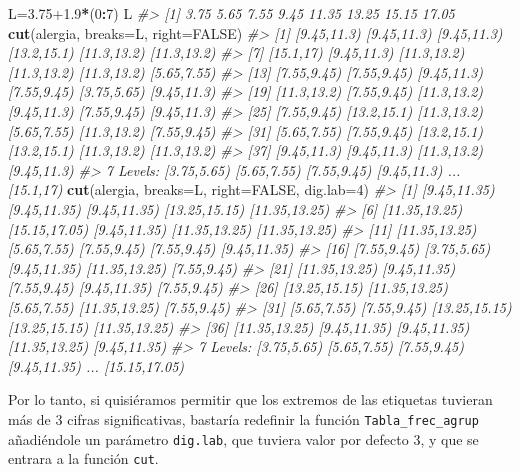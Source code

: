 \documentclass[
]{book}
\newenvironment{Shaded}{\begin{snugshade}}{\end{snugshade}}
\newcommand{\CommentTok}[1]{\textcolor[rgb]{0.56,0.35,0.01}{\textit{#1}}}
\newcommand{\DataTypeTok}[1]{\textcolor[rgb]{0.13,0.29,0.53}{#1}}
\newcommand{\DecValTok}[1]{\textcolor[rgb]{0.00,0.00,0.81}{#1}}
\newcommand{\FloatTok}[1]{\textcolor[rgb]{0.00,0.00,0.81}{#1}}
\newcommand{\KeywordTok}[1]{\textcolor[rgb]{0.13,0.29,0.53}{\textbf{#1}}}
\newcommand{\NormalTok}[1]{#1}
\newcommand{\OperatorTok}[1]{\textcolor[rgb]{0.81,0.36,0.00}{\textbf{#1}}}
\newcommand{\OtherTok}[1]{\textcolor[rgb]{0.56,0.35,0.01}{#1}}
\theoremstyle{definition}
\theoremstyle{definition}
\theoremstyle{definition}
\theoremstyle{remark}
\begin{document}
\begin{Shaded}
\begin{Highlighting}[]
\NormalTok{L=}\FloatTok{3.75+1.9}\OperatorTok{*}\NormalTok{(}\DecValTok{0}\OperatorTok{:}\DecValTok{7}\NormalTok{)}
\NormalTok{L}
\CommentTok{\#\textgreater{} [1]  3.75  5.65  7.55  9.45 11.35 13.25 15.15 17.05}
\KeywordTok{cut}\NormalTok{(alergia, }\DataTypeTok{breaks=}\NormalTok{L, }\DataTypeTok{right=}\OtherTok{FALSE}\NormalTok{)}
\CommentTok{\#\textgreater{}  [1] [9.45,11.3) [9.45,11.3) [9.45,11.3) [13.2,15.1) [11.3,13.2) [11.3,13.2)}
\CommentTok{\#\textgreater{}  [7] [15.1,17)   [9.45,11.3) [11.3,13.2) [11.3,13.2) [11.3,13.2) [5.65,7.55)}
\CommentTok{\#\textgreater{} [13] [7.55,9.45) [7.55,9.45) [9.45,11.3) [7.55,9.45) [3.75,5.65) [9.45,11.3)}
\CommentTok{\#\textgreater{} [19] [11.3,13.2) [7.55,9.45) [11.3,13.2) [9.45,11.3) [7.55,9.45) [9.45,11.3)}
\CommentTok{\#\textgreater{} [25] [7.55,9.45) [13.2,15.1) [11.3,13.2) [5.65,7.55) [11.3,13.2) [7.55,9.45)}
\CommentTok{\#\textgreater{} [31] [5.65,7.55) [7.55,9.45) [13.2,15.1) [13.2,15.1) [11.3,13.2) [11.3,13.2)}
\CommentTok{\#\textgreater{} [37] [9.45,11.3) [9.45,11.3) [11.3,13.2) [9.45,11.3)}
\CommentTok{\#\textgreater{} 7 Levels: [3.75,5.65) [5.65,7.55) [7.55,9.45) [9.45,11.3) ... [15.1,17)}
\KeywordTok{cut}\NormalTok{(alergia, }\DataTypeTok{breaks=}\NormalTok{L, }\DataTypeTok{right=}\OtherTok{FALSE}\NormalTok{, }\DataTypeTok{dig.lab=}\DecValTok{4}\NormalTok{)}
\CommentTok{\#\textgreater{}  [1] [9.45,11.35)  [9.45,11.35)  [9.45,11.35)  [13.25,15.15) [11.35,13.25)}
\CommentTok{\#\textgreater{}  [6] [11.35,13.25) [15.15,17.05) [9.45,11.35)  [11.35,13.25) [11.35,13.25)}
\CommentTok{\#\textgreater{} [11] [11.35,13.25) [5.65,7.55)   [7.55,9.45)   [7.55,9.45)   [9.45,11.35) }
\CommentTok{\#\textgreater{} [16] [7.55,9.45)   [3.75,5.65)   [9.45,11.35)  [11.35,13.25) [7.55,9.45)  }
\CommentTok{\#\textgreater{} [21] [11.35,13.25) [9.45,11.35)  [7.55,9.45)   [9.45,11.35)  [7.55,9.45)  }
\CommentTok{\#\textgreater{} [26] [13.25,15.15) [11.35,13.25) [5.65,7.55)   [11.35,13.25) [7.55,9.45)  }
\CommentTok{\#\textgreater{} [31] [5.65,7.55)   [7.55,9.45)   [13.25,15.15) [13.25,15.15) [11.35,13.25)}
\CommentTok{\#\textgreater{} [36] [11.35,13.25) [9.45,11.35)  [9.45,11.35)  [11.35,13.25) [9.45,11.35) }
\CommentTok{\#\textgreater{} 7 Levels: [3.75,5.65) [5.65,7.55) [7.55,9.45) [9.45,11.35) ... [15.15,17.05)}
\end{Highlighting}
\end{Shaded}

Por lo tanto, si quisiéramos permitir que los extremos de las etiquetas tuvieran más de 3 cifras significativas, bastaría redefinir la función \texttt{Tabla\_frec\_agrup} añadiéndole un parámetro \texttt{dig.lab}, que tuviera valor por defecto 3, y que se entrara a la función \texttt{cut}.
\end{document}
